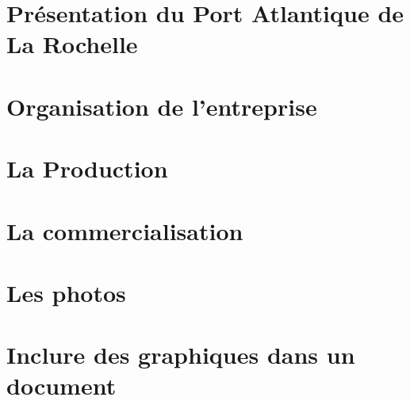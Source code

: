 \documentclass[french]{report}
\begin{document}


%

%

%

%

\tableofcontents


\chapter{Présentation du Port Atlantique de La Rochelle}


\chapter{Organisation de l'entreprise}


\chapter{La Production}


\chapter{La commercialisation}


%

\appendix
\chapter{Les photos}

\chapter{Inclure des graphiques dans un document}



\listoffigures
\end{document}
